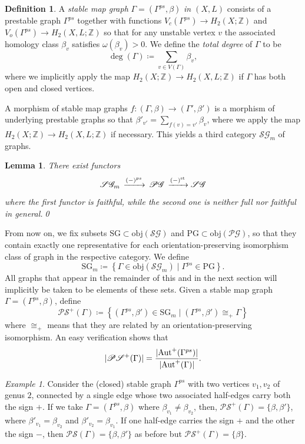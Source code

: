 \documentclass[11pt,psamsfonts, oneside, reqno]{amsart}
\newcommand{\set}[1]{\left\{ #1 \right\}}
\newcommand{\sub}{\subset}%
\newcommand{\s}[2]{\sum\limits_{#1}{#2} }
\newcommand{\cl}{\colon}
\newcommand{\xra}{\xrightarrow}
\newcommand{\scG}{\mathscr{G}}
\newcommand{\scP}{\mathscr{P}}
\newcommand{\scS}{\mathscr{S}}
\newcommand{\Aut}{\normalfont\text{Aut}}
\newcommand{\bZ}{\mathbb{Z}}
\newcommand{\stb}{\normalfont\text{st}}
\newtheorem{lemma}[theorem]{Lemma}
\theoremstyle{definition}
\newtheorem{definition}[theorem]{Definition}
\theoremstyle{remark}
\newtheorem{example}[theorem]{Example}
\numberwithin{equation}{section}
\begin{document}
\begin{definition}\label{de:stable-map-graph} A \emph{stable map graph} $\Gamma = (\Gamma^{ps},\beta)$ \emph{in $(X,L)$} consists of a prestable graph $\Gamma^{ps}$ together with functions $V_c(\Gamma^{ps})\to H_2(X;\bZ)$ and $ V_o(\Gamma^{ps})\to H_2(X,L;\bZ)$ so that for any unstable vertex $v$ the associated homology class $\beta_v$ satisfies $\omega(\beta_v) > 0$. We define the \emph{total degree} of $\Gamma$ to be 
	$$\deg(\Gamma) \coloneqq \s{v\in V(\Gamma)}{\beta_v},$$ 
	\noindent where we implicitly apply the map $H_2(X;\bZ)\to H_2(X,L;\bZ)$ if $\Gamma$ has both open and closed vertices.
\end{definition}

A morphism of stable map graphs $f\cl (\Gamma,\beta)\to (\Gamma',\beta')$ is a morphism of underlying prestable graphs so that $\beta'_{v'} = \s{f(v) = v'}{\beta_v}$, where we apply the map $H_2(X;\bZ)\to H_2(X,L;\bZ)$ if necessary. This yields a third category $\scS\scG_m$ of graphs. 

\begin{lemma} There exist functors 
	\begin{equation*}\label{}
		\scS\scG_m \,\xra{(-)^{ps}}\, \scP\scG \,\xra{(-)^{\stb}} \scS\scG
	\end{equation*}
	where the first functor is faithful, while the second one is neither full nor faithful in general.\qed
\end{lemma}

From now on, we fix subsets $\text{SG}\sub \text{obj}(\scS\scG)$ and $\text{PG}\sub \text{obj}(\scP\scG)$, so that they contain exactly one representative for each orientation-preserving isomorphism class of graph in the respective category. We define 
\[\text{SG}_m \coloneqq \set{\Gamma\in \text{obj}(\scS\scG_m)\mid \Gamma^{ps} \in \text{PG}}.\]
All graphs that appear in the remainder of this and in the next section will implicitly be taken to be elements of these sets. Given a stable map graph $\Gamma = (\Gamma^{ps},\beta)$, define 
\[\scP\scS^+(\Gamma)\coloneqq \set{(\Gamma^{ps},\beta')\in \text{SG}_m\mid (\Gamma^{ps},\beta')\cong_+ \Gamma }\]
where $\cong_+$ means that they are related by an orientation-preserving isomorphism.
An easy verification shows that 
\begin{equation}\label{eq:prestable-graphs-double-counting}
	|\scP\scS^+(\Gamma)| = \frac{|\Aut^+(\Gamma^{ps})|}{|\Aut^+(\Gamma)|}.
\end{equation}

\begin{example} Consider the (closed) stable graph $\Gamma^{ps}$ with two vertices $v_1,v_2$ of genus $2$, connected by a single edge whose two associated half-edges carry both the sign $+$. If we take $\Gamma = (\Gamma^{ps},\beta)$ where $\beta_{v_1}\neq \beta_{v_2}$, then, $\scP\scS^+(\Gamma) = \{\beta,\beta'\}$, where $\beta'_{v_1} = \beta_{v_2}$ and $\beta'_{v_2} = \beta_{v_1}$. If one half-edge carries the sign $+$ and the other the sign $-$, then $\scP\scS(\Gamma) = \{\beta,\beta'\}$ as before but $\scP\scS^+(\Gamma) = \{\beta\}$.
\end{example}
\end{document}
